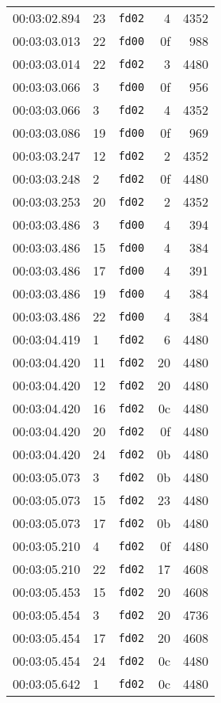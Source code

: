 \documentclass{article}
\begin{document}
\begin{longtable}{lllrr}
00:03:02.894 & 23 & \texttt{fd02} & 4 & 4352 \\
00:03:03.013 & 22 & \texttt{fd00} & 0f & 988 \\
00:03:03.014 & 22 & \texttt{fd02} & 3 & 4480 \\
00:03:03.066 & 3 & \texttt{fd00} & 0f & 956 \\
00:03:03.066 & 3 & \texttt{fd02} & 4 & 4352 \\
00:03:03.086 & 19 & \texttt{fd00} & 0f & 969 \\
00:03:03.247 & 12 & \texttt{fd02} & 2 & 4352 \\
00:03:03.248 & 2 & \texttt{fd02} & 0f & 4480 \\
00:03:03.253 & 20 & \texttt{fd02} & 2 & 4352 \\
00:03:03.486 & 3 & \texttt{fd00} & 4 & 394 \\
00:03:03.486 & 15 & \texttt{fd00} & 4 & 384 \\
00:03:03.486 & 17 & \texttt{fd00} & 4 & 391 \\
00:03:03.486 & 19 & \texttt{fd00} & 4 & 384 \\
00:03:03.486 & 22 & \texttt{fd00} & 4 & 384 \\
00:03:04.419 & 1 & \texttt{fd02} & 6 & 4480 \\
00:03:04.420 & 11 & \texttt{fd02} & 20 & 4480 \\
00:03:04.420 & 12 & \texttt{fd02} & 20 & 4480 \\
00:03:04.420 & 16 & \texttt{fd02} & 0c & 4480 \\
00:03:04.420 & 20 & \texttt{fd02} & 0f & 4480 \\
00:03:04.420 & 24 & \texttt{fd02} & 0b & 4480 \\
00:03:05.073 & 3 & \texttt{fd02} & 0b & 4480 \\
00:03:05.073 & 15 & \texttt{fd02} & 23 & 4480 \\
00:03:05.073 & 17 & \texttt{fd02} & 0b & 4480 \\
00:03:05.210 & 4 & \texttt{fd02} & 0f & 4480 \\
00:03:05.210 & 22 & \texttt{fd02} & 17 & 4608 \\
00:03:05.453 & 15 & \texttt{fd02} & 20 & 4608 \\
00:03:05.454 & 3 & \texttt{fd02} & 20 & 4736 \\
00:03:05.454 & 17 & \texttt{fd02} & 20 & 4608 \\
00:03:05.454 & 24 & \texttt{fd02} & 0c & 4480 \\
00:03:05.642 & 1 & \texttt{fd02} & 0c & 4480 \\

\end{longtable}
\end{document}
